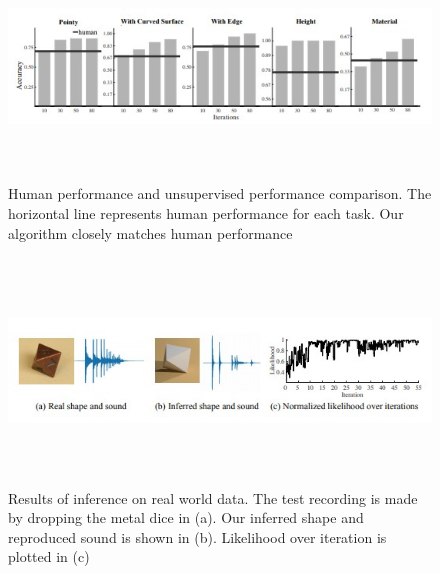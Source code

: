 \documentclass[12pt]{article}
\begin{document}
\begin{figure}[H]
	\includegraphics[width=16cm, height=6cm]{fig3.jpg}
	\caption{Human performance and unsupervised performance comparison. The horizontal line
represents human performance for each task. Our algorithm closely matches human performance}
	\label{fig:fig3} 	
\end{figure}

\begin{figure}[H]
	\includegraphics[width=16cm, height=6cm]{fig4.jpg}
	\caption{Results of inference on real world data. The test recording is made by dropping the metal
dice in (a). Our inferred shape and reproduced sound is shown in (b). Likelihood over iteration is
plotted in (c)}
	\label{fig:fig4} 	
\end{figure}


\cite{gratzer2007more}


 
\end{document}
